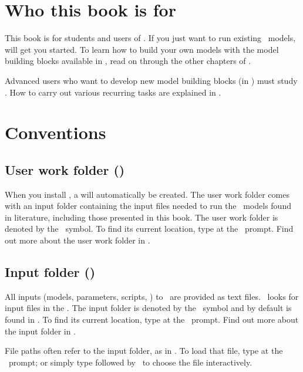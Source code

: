 \section{Who this book is for}

This book is for students and users of \US. If you just want to run existing \US\ models,  will get you started. To learn how to build your own models with the model building blocks available in \US, read on through the other chapters of .

Advanced users who want to develop new model building blocks (in \CPP) must study . How to carry out various recurring tasks are explained in . 

\section{Conventions}
\label{ch:conventions}

\subsection{User work folder (\ushome)}
When you install \US, a  will automatically be created. The user work folder comes with an input folder containing the input files needed to run the \US\ models found in literature, including those presented in this book. The user work folder is denoted by the \ushome\ symbol. To find its current location, type  at the \US\ prompt. Find out more about the user work folder in .  

\subsection{Input folder ()}
All inputs (models, parameters, scripts, \etc) to \US\ are provided as text files. \US\ looks for input files in the . The input folder is denoted by the \ symbol and by default is found in . To find its current location, type  at the \US\ prompt. Find out more about the input folder in .  

File paths often refer to the input folder, as in . To load that file, type  at the \US\ prompt; or simply type  followed by \autofillkey\ to choose the file interactively. 

